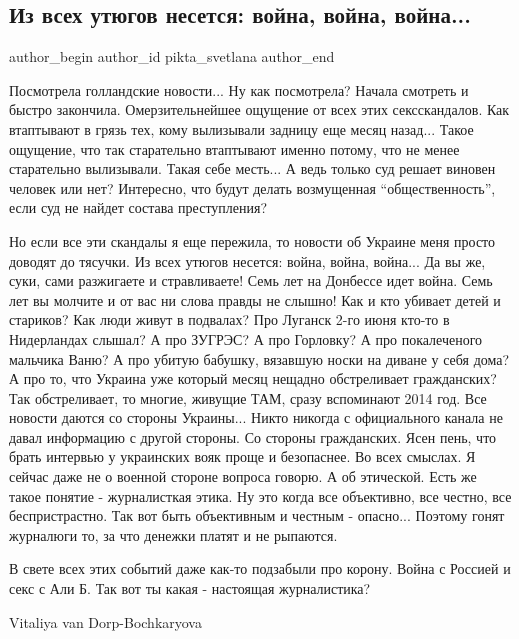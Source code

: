  
 
 
 
 
 
\subsection{Из всех утюгов несется: война, война, война...}
\label{sec:22_01_2022.tg.pikta_svetlana.1.vojna}
 
\ifcmt
 author_begin
   author_id pikta_svetlana
 author_end
\fi

Посмотрела голландские новости... Ну как посмотрела? Начала смотреть и быстро
закончила. Омерзительнейшее ощущение от всех этих сексскандалов. Как втаптывают
в грязь тех, кому вылизывали задницу еще месяц назад... Такое ощущение, что так
старательно втаптывают именно потому, что не менее старательно вылизывали.
Такая себе месть... А ведь только суд решает виновен человек или нет?
Интересно, что будут делать возмущенная \enquote{общественность}, если суд не найдет
состава преступления? 

Но если все эти скандалы я еще пережила, то новости об Украине меня просто
доводят до тясучки. Из всех утюгов несется: война, война, война... Да вы же,
суки, сами разжигаете и стравливаете! Семь лет на Донбессе идет война. Семь лет
вы молчите и от вас ни слова правды не слышно! Как и кто убивает детей и
стариков? Как люди живут в подвалах? Про Луганск 2-го июня кто-то в Нидерландах
слышал? А про ЗУГРЭС? А про Горловку? А про покалеченого мальчика Ваню? А про
убитую бабушку, вязавшую носки на диване у себя дома? А про то, что Украина уже
который месяц нещадно обстреливает гражданских? Так обстреливает, то многие,
живущие ТАМ, сразу вспоминают 2014 год. Все новости даются со стороны
Украины... Никто никогда с официального канала не давал информацию с другой
стороны. Со стороны гражданских. Ясен пень, что брать интервью у украинских
вояк проще и безопаснее. Во всех смыслах. Я сейчас даже не о военной стороне
вопроса говорю. А об этической. Есть же такое понятие - журналисткая этика. Ну
это когда все объективно, все честно, все беспристрастно. Так вот быть
объективным и честным - опасно... Поэтому гонят журналюги то, за что денежки
платят и не рыпаются. 

В свете всех этих событий даже как-то подзабыли про корону. Война с Россией и
секс с Али Б. Так вот ты какая - настоящая журналистика?

Vitaliya van Dorp-Bochkaryova
